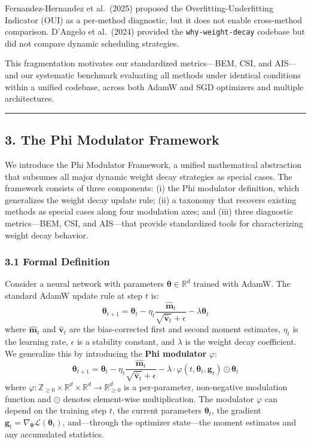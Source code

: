 \documentclass[
]{article}
\begin{document}
Fernandez-Hernandez et al.~(2025) proposed the Overfitting-Underfitting
Indicator (OUI) as a per-method diagnostic, but it does not enable
cross-method comparison. D'Angelo et al.~(2024) provided the
\texttt{why-weight-decay} codebase but did not compare dynamic
scheduling strategies.

This fragmentation motivates our standardized metrics---BEM, CSI, and
AIS---and our systematic benchmark evaluating all methods under
identical conditions within a unified codebase, across both AdamW and
SGD optimizers and multiple architectures.

\begin{center}\rule{0.5\linewidth}{0.5pt}\end{center}

\hypertarget{the-phi-modulator-framework}{%
\subsection{3. The Phi Modulator
Framework}\label{the-phi-modulator-framework}}

We introduce the Phi Modulator Framework, a unified mathematical
abstraction that subsumes all major dynamic weight decay strategies as
special cases. The framework consists of three components: (i) the Phi
modulator definition, which generalizes the weight decay update rule;
(ii) a taxonomy that recovers existing methods as special cases along
four modulation axes; and (iii) three diagnostic metrics---BEM, CSI, and
AIS---that provide standardized tools for characterizing weight decay
behavior.

\hypertarget{formal-definition}{%
\subsubsection{3.1 Formal Definition}\label{formal-definition}}

Consider a neural network with parameters
\(\boldsymbol{\theta} \in \mathbb{R}^d\) trained with AdamW. The
standard AdamW update rule at step \(t\) is: \[
\boldsymbol{\theta}_{t+1} = \boldsymbol{\theta}_t - \eta_t \frac{\hat{\mathbf{m}}_t}{\sqrt{\hat{\mathbf{v}}_t} + \epsilon} - \lambda \boldsymbol{\theta}_t
\] where \(\hat{\mathbf{m}}_t\) and \(\hat{\mathbf{v}}_t\) are the
bias-corrected first and second moment estimates, \(\eta_t\) is the
learning rate, \(\epsilon\) is a stability constant, and \(\lambda\) is
the weight decay coefficient. We generalize this by introducing the
\textbf{Phi modulator} \(\varphi\): \[
\boldsymbol{\theta}_{t+1} = \boldsymbol{\theta}_t - \eta_t \frac{\hat{\mathbf{m}}_t}{\sqrt{\hat{\mathbf{v}}_t} + \epsilon} - \lambda \cdot \varphi(t, \boldsymbol{\theta}_t, \mathbf{g}_t) \odot \boldsymbol{\theta}_t
\] where
\(\varphi : \mathbb{Z}_{\geq 0} \times \mathbb{R}^d \times \mathbb{R}^d \to \mathbb{R}^d_{\geq 0}\)
is a per-parameter, non-negative modulation function and \(\odot\)
denotes element-wise multiplication. The modulator \(\varphi\) can
depend on the training step \(t\), the current parameters
\(\boldsymbol{\theta}_t\), the gradient
\(\mathbf{g}_t = \nabla_{\boldsymbol{\theta}} \mathcal{L}(\boldsymbol{\theta}_t)\),
and---through the optimizer state---the moment estimates and any
accumulated statistics.
\end{document}
